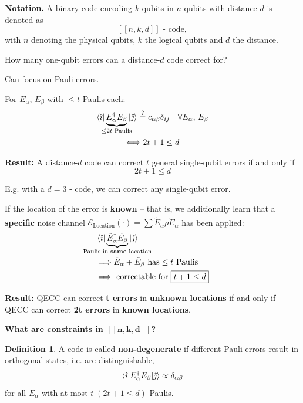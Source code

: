 \documentclass[a4paper, 12pt]{article}
\theoremstyle{plain}
\theoremstyle{definition}
\newtheorem*{definition}{Definition}
\theoremstyle{remark}
\begin{document}
\textbf{Notation.} A binary code encoding $k$ qubits in $n$ qubits with distance $d$ is denoted as
\[[[n,k,d]]\text{ - code},\]
with $n$ denoting the physical qubits, $k$ the logical qubits and $d$ the distance.

How many one-qubit errors can a distance-$d$ code correct for?

Can focus on Pauli errors.

For $E_\alpha,\, E_\beta$ with $\leq t$ Paulis each:
\begin{gather*}
  \braket{\hat{\imath}|\underbrace{E_\alpha^\dagger E_\beta}_{\mathclap{\leq 2t \text{ Paulis}}}|\hat{\jmath}} \overset{?}{=} c_{\alpha\beta} \delta_{ij} \quad \forall E_\alpha,\, E_\beta\\
  \Longleftrightarrow 2t + 1 \leq d
\end{gather*}

\textbf{Result:} A distance-$d$ code can correct $t$ general single-qubit errors if and only if
\begin{equation*}
  2t + 1 \leq d
\end{equation*}

E.g. with a $d=3$ - code, we can correct any single-qubit error.

If the location of the error is \textbf{known} -- that is, we additionally learn that a \textbf{specific} noise channel $\mathcal{E}_\text{Location}(\cdot)=\sum \tilde{E}_\alpha \rho \tilde{E}_\alpha^\dagger$ has been applied:
\begin{align*}
  &\braket{\hat{\imath}|\underbrace{\tilde{E}_\alpha^\dagger \tilde{E}_\beta}_{\mathclap{\text{Paulis in \textbf{same} location}}}|\hat{\jmath}}\\
  &\Longrightarrow \tilde{E}_\alpha + \tilde{E}_\beta \text{ has}\leq t \text{ Paulis} \\
  &\Longrightarrow \text{ correctable for } \boxed{t+1 \leq d}
\end{align*}

\textbf{Result:} QECC can correct \textbf{t errors} in \textbf{unknown locations} if and only if QECC can correct \textbf{2t errors} in \textbf{known locations}.

\textbf{What are constraints in $\bm{[[n,k,d]]}$?}

\begin{definition}
  A code is called \textbf{non-degenerate} if different Pauli errors result in orthogonal states, i.e. are distinguishable,
  \begin{equation*}
    \braket{\hat{\imath}|E_\alpha^\dagger E_\beta|\hat{\jmath}} \propto \delta_{\alpha\beta}
  \end{equation*}
  for all $E_\alpha$ with at most $t\;(2t+1\leq d)$ Paulis.
\end{definition}
\end{document}
